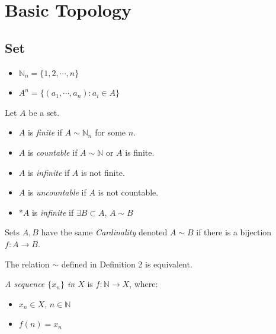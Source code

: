 \setcounter{chapter}{0}
\chapter{Basic Topology}

\setcounter{section}{0}
\section{Set}

\begin{notation}
    \begin{itemize} ~
        \item $\mathbb{N}_{n} = \{ 1,2,\cdots ,n \}$
        \item $A^{n} = \{ (a_1,\cdots ,a_n):a_i \in A \}$
    \end{itemize}
\end{notation}

\begin{definition} Let $A$ be a set.
    \begin{itemize}
        \item $A$ is \textit{finite} if $A \sim \mathbb{N}_{n}$ for some $n$.
        \item $A$ is \textit{countable} if $A \sim \mathbb{N}$ or $A$ is finite.
        \item $A$ is \textit{infinite} if $A$ is not finite.
        \item $A$ is \textit{uncountable} if $A$ is not countable.
        \item *$A$ is \textit{infinite} if $\exists B \subset A$, $A \sim B$
    \end{itemize}
\end{definition}

\begin{definition}[Cardinality] Sets $A,B$ have the same \textit{Cardinality} denoted $A \sim B$ if there is a bijection $f:A \to B$.
\end{definition}

\begin{remark}
The relation $\sim $ defined in Definition 2 is equivalent.
\end{remark}

\begin{definition}[Sequence] \textit{A sequence $\{ x_n \}$ in $X$} is $f: \mathbb{N} \to X$, where:
    \begin{itemize}
        \item $x_n \in X$, $n \in \mathbb{N}$
        \item $f(n) = x_n$
    \end{itemize}
\end{definition}

